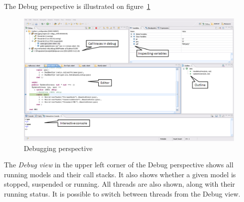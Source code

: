 The Debug perspective is illustrated on figure~\ref{fig:userguide:DebuggingVDM}
\begin{figure}[htp]
\begin{center}
  \includegraphics[width=4.5in]{figures/DebuggingVDMRT}
  \caption[Debugging perspective]{Debugging perspective}
  \label{fig:userguide:DebuggingVDM}
\end{center}
\end{figure}
The \emph{Debug view} in the upper left corner of the Debug
perspective shows all running models and their call stacks. It also
shows whether a given model is stopped, suspended or running. All
threads are also shown, along with their running status. It is
possible to switch between threads from the Debug view.

